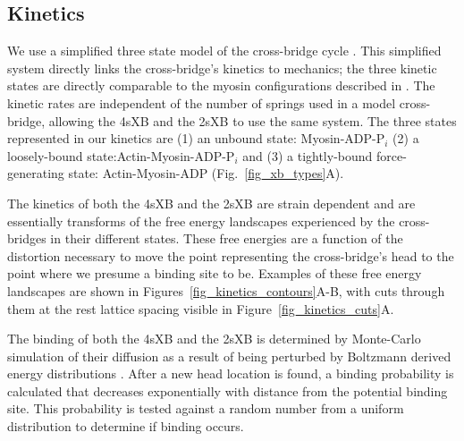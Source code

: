 \documentclass[]{article}
\begin{document}
\subsection*{Kinetics} %

We use a simplified three state model of the cross-bridge cycle \citep{Pate1989, Tanner2007}. 
This simplified system directly links the cross-bridge's kinetics to mechanics; the three kinetic states are directly comparable to the myosin configurations described in \citet{Houdusse2000}. 
The kinetic rates are independent of the number of springs used in a model cross-bridge, allowing the 4sXB and the 2sXB to use the same system. 
The three states represented in our kinetics are (1) an unbound state: Myosin-ADP-P$_i$ (2) a loosely-bound state:Actin-Myosin-ADP-P$_i$ and (3) a tightly-bound force-generating state: Actin-Myosin-ADP (Fig.~\ref{fig_xb_types}A).

The kinetics of both the 4sXB and the 2sXB are strain dependent and are essentially transforms of the free energy landscapes experienced by the cross-bridges in their different states.
These free energies are a function of the distortion necessary to move the point representing the cross-bridge's head to the point where we presume a binding site to be.
Examples of these free energy landscapes are shown in Figures~\ref{fig_kinetics_contours}A-B, with cuts through them at the rest lattice spacing visible in Figure~\ref{fig_kinetics_cuts}A.

The binding of both the 4sXB and the 2sXB is determined by Monte-Carlo simulation of their diffusion as a result of being perturbed by Boltzmann derived energy distributions \citep{DillBook}. 
After a new head location is found, a binding probability is calculated that decreases exponentially with distance from the potential binding site. 
This probability is tested against a random number from a uniform distribution to determine if binding occurs.
\end{document}
